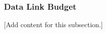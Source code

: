 
\subsubsection{Data Link Budget}
\label{subsubsec:design_11_4_data_link_budget}

[Add content for this subsection.]
